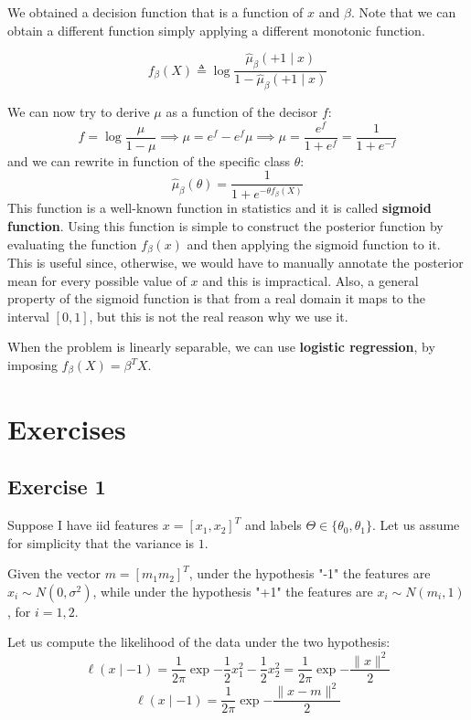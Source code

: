 We obtained a decision function that is a function of $x$ and $\beta$. 
Note that we can obtain a different function simply applying a different monotonic function.

\[
    f_\beta(X) \triangleq \log \frac{\hat{\mu}_\beta(+1\mid x)}{1 - \hat{\mu}_\beta(+1\mid x)}
\]

We can now try to derive $\mu$ as a function of the decisor $f$:
\[
    f=\log\frac\mu{1-\mu}\implies \mu=e^f-e^f\mu\implies \mu = \frac{e^f}{1+e^f} = \frac{1}{1 + e^{-f}}
\]
and we can rewrite in function of the specific class $\theta$:
\[
    \hat{\mu}_{\beta}(\theta) = \frac{1}{1 + e^{-\theta f_\beta(X)}}
\]
This function is a well-known function in statistics and it is called \textbf{sigmoid function}.
Using this function is simple to construct the posterior function by evaluating the function $f_\beta(x)$ and then applying the sigmoid function to it. 
This is useful since, otherwise, we would have to manually annotate the posterior mean for every possible value of $x$ and this is impractical.
Also, a general property of the sigmoid function is that from a real domain it maps to the interval $[0,1]$, but this is not the real reason why we use it. 

When the problem is linearly separable, we can use \textbf{logistic regression}, by imposing $f_\beta(X) = \beta^T X$.


\section{Exercises}
\subsection{Exercise 1}
Suppose I have iid features $x = [x_1, x_2]^T$ and labels $\Theta \in \{\theta_0, \theta_1\}$. Let us assume for simplicity that the variance is $1$.

Given the vector $m = [m_1 m_2]^T$, under the hypothesis "-1" the features are $x_i \sim N(0, \sigma^2)$, while under the hypothesis "+1" the features are $x_i \sim N(m_i, 1)$, for $i=1,2$.

Let us compute the likelihood of the data under the two hypothesis:
\[
    \ell(x \mid -1 ) = \frac{1}{2\pi} \exp{-\frac{1}{2} x_1^2 - \frac{1}{2} x_2^2 } = \frac{1}{2\pi} \exp{- \frac{\|x\|^2}{2}}
\]
\[
    \ell(x \mid -1 ) = \frac{1}{2\pi} \exp{- \frac{\|x-m\|^2}{2}}
\]
